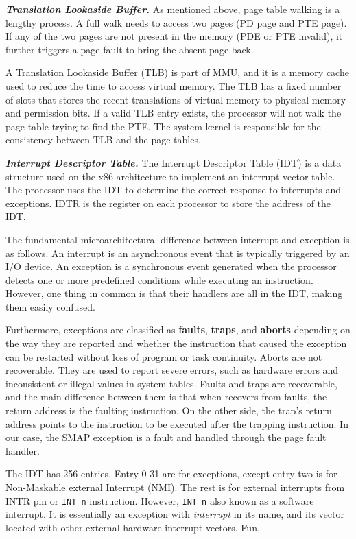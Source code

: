 \textbf{\textit{Translation Lookaside Buffer.}} As mentioned above, page table walking is a lengthy process. A full walk needs to access two pages (PD page and PTE page). If any of the two pages are not present in the memory (PDE or PTE invalid), it further triggers a page fault to bring the absent page back.

A Translation Lookaside Buffer (TLB) is part of MMU, and it is a memory cache used to reduce the time to access virtual memory. The TLB has a fixed number of slots that stores the recent translations of virtual memory to physical memory and permission bits. If a valid TLB entry exists, the processor will not walk the page table trying to find the PTE. The system kernel is responsible for the consistency between TLB and the page tables.


\textbf{\textit{Interrupt Descriptor Table.}} The Interrupt Descriptor Table (IDT) is a data structure used on the x86 architecture to implement an interrupt vector table. The processor uses the IDT to determine the correct response to interrupts and exceptions. IDTR is the register on each processor to store the address of the IDT.


The fundamental microarchitectural difference between interrupt and exception is as follows.  An interrupt is an asynchronous event
that is typically triggered by an I/O device. An exception is a
synchronous event generated when the processor detects one
or more predefined conditions while executing an instruction. However, one thing in common is that their handlers are all in the IDT, making them easily confused.

Furthermore, exceptions are classified as \textbf{faults}, \textbf{traps}, and \textbf{aborts} depending on the way they are reported and whether the instruction that caused the exception can be restarted without loss of program or task continuity. Aborts are not recoverable. They are used to report severe errors, such as hardware errors and inconsistent or illegal values in system tables. Faults and traps are recoverable, and the main difference between them is that when recovers from faults, the return address is the faulting instruction. On the other side, the trap's return address points to the instruction to be executed after the trapping instruction. In our case, the SMAP exception is a fault and handled through the page fault handler.

The IDT has 256 entries. Entry 0-31 are for exceptions, except entry two is for Non-Maskable external Interrupt (NMI). The rest is for external interrupts from INTR pin or \texttt{INT n} instruction. However, \texttt{INT n} also known as a software interrupt. It is essentially an exception with \textit{interrupt} in its name, and its vector located with other external hardware interrupt vectors. Fun.



